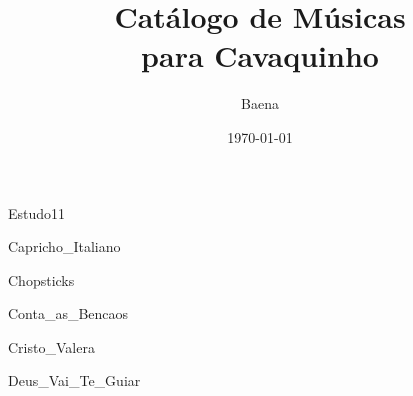 \documentclass{scrartcl}
\begin{document}
\title{\textbf{\Huge Catálogo de Músicas\\ para Cavaquinho}}
\author{Baena}
\date{\today}
\maketitle
\thispagestyle{empty}
\newpage

\setcounter{page}{1}

\begin{multicols}{2}
\tableofcontents
\end{multicols}

\cleardoublepage
{}
\setcounter{page}{1}












{Estudo11}











{Capricho_Italiano}



{Chopsticks}



{Conta_as_Bencaos}



{Cristo_Valera}



{Deus_Vai_Te_Guiar}
\end{document}
